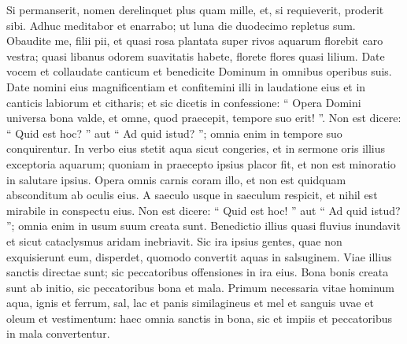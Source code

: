 \begin{biblechapter}
\begin{biblechapter}
\begin{biblechapter}
\begin{biblechapter}
\begin{biblechapter}
\begin{biblechapter}
\begin{biblechapter}
\begin{biblechapter}
\begin{biblechapter}
\begin{biblechapter}
\begin{biblechapter}
\begin{biblechapter}
\begin{biblechapter}
\begin{biblechapter}
\begin{biblechapter}
\begin{biblechapter}
\begin{biblechapter}
\begin{biblechapter}
\begin{biblechapter}
\begin{biblechapter}
\begin{biblechapter}
\begin{biblechapter}
\begin{biblechapter}
\begin{biblechapter}
\begin{biblechapter}
\begin{biblechapter}
\begin{biblechapter}
\begin{biblechapter}
\begin{biblechapter}
\begin{biblechapter}
\begin{biblechapter}
\begin{biblechapter}
\begin{biblechapter}
\begin{biblechapter}
\begin{biblechapter}
\begin{biblechapter}
\begin{biblechapter}
\begin{biblechapter}
\begin{biblechapter}
 \verse Si permanserit, nomen derelinquet plus quam mille,
 et, si requieverit, proderit sibi.
 \verse Adhuc meditabor et enarrabo;
 ut luna die duodecimo repletus sum.
 \verse Obaudite me, filii pii,
 et quasi rosa plantata super rivos aquarum florebit caro vestra;
 \verse quasi libanus odorem suavitatis habete,
 \verse florete flores quasi lilium.
 Date vocem et collaudate canticum
 et benedicite Dominum in omnibus operibus suis.
 \verse Date nomini eius magnificentiam
 et confitemini illi in laudatione eius
 et in canticis labiorum et citharis;
 et sic dicetis in confessione:
 \verse “ Opera Domini universa bona valde,
 et omne, quod praecepit, tempore suo erit! ”.
 Non est dicere: “ Quid est hoc? ” aut “ Ad quid istud? ”;
 omnia enim in tempore suo conquirentur.
 \verse In verbo eius stetit aqua sicut congeries,
 et in sermone oris illius exceptoria aquarum;
 \verse quoniam in praecepto ipsius placor fit,
 et non est minoratio in salutare ipsius.
 \verse Opera omnis carnis coram illo,
 et non est quidquam absconditum ab oculis eius.
 \verse A saeculo usque in saeculum respicit,
 et nihil est mirabile in conspectu eius.
 \verse Non est dicere: “ Quid est hoc! ” aut “ Ad quid istud? ”;
 omnia enim in usum suum creata sunt.
 \verse Benedictio illius quasi fluvius inundavit
 \verse et sicut cataclysmus aridam inebriavit.
 Sic ira ipsius gentes, quae non exquisierunt eum, disperdet,
 \verse quomodo convertit aquas in salsuginem.
 Viae illius sanctis directae sunt;
 sic peccatoribus offensiones in ira eius.
 \verse Bona bonis creata sunt ab initio,
 sic peccatoribus bona et mala.
 \verse Primum necessaria vitae hominum aqua, ignis et ferrum,
 sal, lac et panis similagineus et mel et sanguis uvae et oleum et vestimentum:
 \verse haec omnia sanctis in bona,
 sic et impiis et peccatoribus in mala convertentur.

\end{biblechapter}
\end{biblechapter}
\end{biblechapter}
\end{biblechapter}
\end{biblechapter}
\end{biblechapter}
\end{biblechapter}
\end{biblechapter}
\end{biblechapter}
\end{biblechapter}
\end{biblechapter}
\end{biblechapter}
\end{biblechapter}
\end{biblechapter}
\end{biblechapter}
\end{biblechapter}
\end{biblechapter}
\end{biblechapter}
\end{biblechapter}
\end{biblechapter}
\end{biblechapter}
\end{biblechapter}
\end{biblechapter}
\end{biblechapter}
\end{biblechapter}
\end{biblechapter}
\end{biblechapter}
\end{biblechapter}
\end{biblechapter}
\end{biblechapter}
\end{biblechapter}
\end{biblechapter}
\end{biblechapter}
\end{biblechapter}
\end{biblechapter}
\end{biblechapter}
\end{biblechapter}
\end{biblechapter}
\end{biblechapter}
